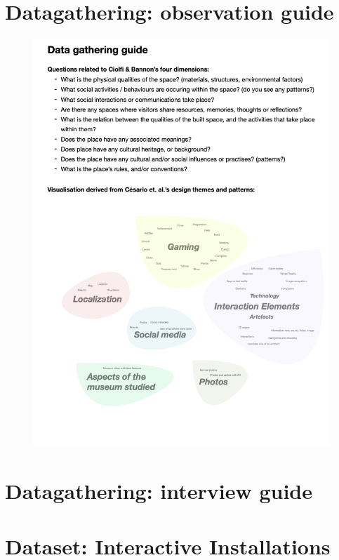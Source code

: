 \section{Datagathering: observation guide}
\begin{figure}[H]
\includegraphics[width=13cm]{pictures/appendix/datagathering.png}
\centering 
\end{figure}

\section{Datagathering: interview guide}
\section{Dataset: Interactive Installations}

